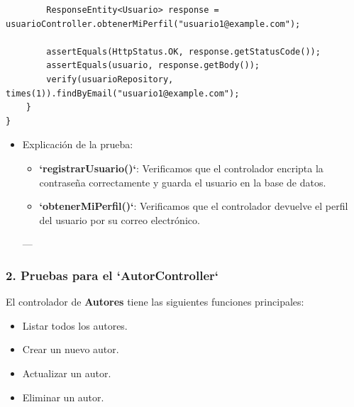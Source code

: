 \documentclass[11pt]{article}
\begin{document}
\begin{itemize}
\begin{verbatim}
        ResponseEntity<Usuario> response = usuarioController.obtenerMiPerfil("usuario1@example.com");

        assertEquals(HttpStatus.OK, response.getStatusCode());
        assertEquals(usuario, response.getBody());
        verify(usuarioRepository, times(1)).findByEmail("usuario1@example.com");
    }
}
\end{verbatim}

\begin{itemize}
\item Explicación de la prueba:
\label{sec:orgd3e57ee}
\begin{itemize}
\item \textbf{\textbf{`registrarUsuario()`}}: Verificamos que el controlador encripta la contraseña correctamente y guarda el usuario en la base de datos.
\item \textbf{\textbf{`obtenerMiPerfil()`}}: Verificamos que el controlador devuelve el perfil del usuario por su correo electrónico.
\end{itemize}

---
\end{itemize}
\end{itemize}

\subsubsection{2. Pruebas para el `AutorController`}
\label{sec:org338ea09}

El controlador de \textbf{\textbf{Autores}} tiene las siguientes funciones principales:
\begin{itemize}
\item Listar todos los autores.
\item Crear un nuevo autor.
\item Actualizar un autor.
\item Eliminar un autor.
\end{itemize}
\end{document}
